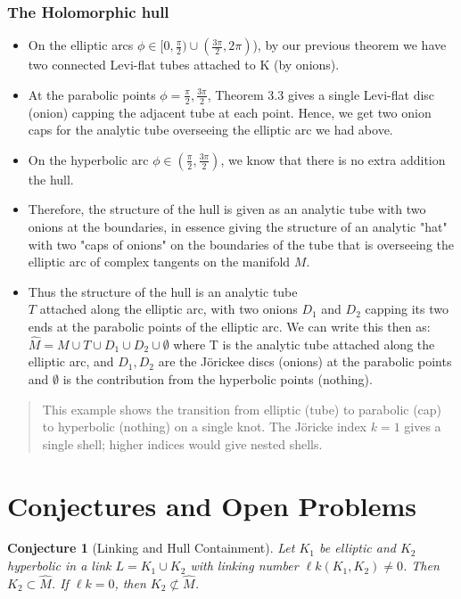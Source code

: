 \documentclass{amsart}
\newtheorem{conjecture}[theorem]{Conjecture}
\newcommand{\hatM}{\widehat{M}}
\begin{document}
\subsubsection{The Holomorphic hull} 
\begin{itemize} \item On the elliptic arcs $\phi \in [0, \frac{\pi}{2}) \cup  (\frac{3\pi}{2}, 2\pi)$), by our previous theorem we have  two connected Levi-flat tubes attached to K (by onions). 
\item At the parabolic points $\phi = \frac{\pi}{2}, \frac{3\pi}{2}$, Theorem 3.3 gives a single Levi-flat disc (onion) capping the adjacent tube at each point. Hence, we get two onion caps for the analytic tube  overseeing the elliptic arc we had above.
\item On the hyperbolic arc $\phi \in  (\frac{\pi}{2}, \frac{3\pi}{2})$, we know that there is no extra addition the hull. 
\item Therefore, the structure of the hull is given as an analytic tube with two onions at the boundaries, in essence giving the structure of an analytic "hat" with two "caps of onions" on the boundaries of the tube that is overseeing the elliptic arc of complex tangents on the manifold $M$.
\item Thus the structure of the hull is an analytic tube \\$T$ attached along the elliptic arc, with two onions $D_1$ and $D_2$ capping its two ends at the parabolic points of the elliptic arc. We can write this then as: $\widehat{M} = M \cup T \cup D_1 \cup D_2 \cup \emptyset$ where T is the analytic tube attached along the elliptic arc, and $D_1, D_2$ are the Jörickee discs (onions) at the parabolic points and $\emptyset$ is the contribution from the hyperbolic points (nothing).
\end{itemize} 
\begin{quote}
    
This example shows the transition from elliptic (tube) to parabolic (cap) to hyperbolic (nothing) on a single knot. The Jöricke index $k = 1$ gives a single shell; higher indices would give nested shells. 
\end{quote} 

\section{Conjectures and Open Problems}


\begin{conjecture}[Linking and Hull Containment]
Let $K_1$ be elliptic and $K_2$ hyperbolic in a link $L = K_1 \cup K_2$ with linking number $\ell k(K_1, K_2) \neq 0$. Then $K_2 \subset \hatM$. If $\ell k = 0$, then $K_2 \not\subset \hatM$.
\end{conjecture}
\end{document}
